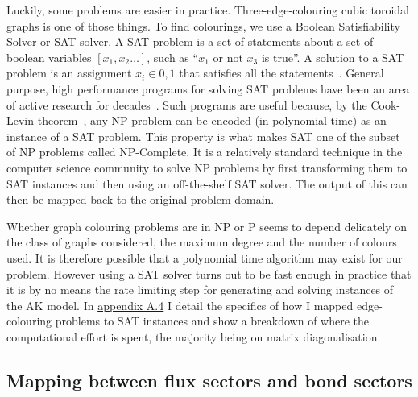 Luckily, some problems are easier in practice. Three-edge-colouring cubic toroidal graphs is one of those things. To find colourings, we use a Boolean Satisfiability Solver or SAT solver. A SAT problem is a set of statements about a set of boolean variables \([x_1, x_2\ldots]\), such as ``\(x_1\) or not \(x_3\) is true''. A solution to a SAT problem is an assignment \(x_i \in {0,1}\) that satisfies all the statements~\autocite{Karp1972}. General purpose, high performance programs for solving SAT problems have been an area of active research for decades~\autocite{alounehComprehensiveStudyAnalysis2019}. Such programs are useful because, by the Cook-Levin theorem~\autocite{cookComplexityTheoremprovingProcedures1971,levin1973universal}, any NP problem can be encoded (in polynomial time) as an instance of a SAT problem. This property is what makes SAT one of the subset of NP problems called NP-Complete. It is a relatively standard technique in the computer science community to solve NP problems by first transforming them to SAT instances and then using an off-the-shelf SAT solver. The output of this can then be mapped back to the original problem domain.

Whether graph colouring problems are in NP or P seems to depend delicately on the class of graphs considered, the maximum degree and the number of colours used. It is therefore possible that a polynomial time algorithm may exist for our problem. However using a SAT solver turns out to be fast enough in practice that it is by no means the rate limiting step for generating and solving instances of the AK model. In \protect\hyperlink{app-lattice-generation}{appendix A.4} I detail the specifics of how I mapped edge-colouring problems to SAT instances and show a breakdown of where the computational effort is spent, the majority being on matrix diagonalisation.

\hypertarget{mapping-between-flux-sectors-and-bond-sectors}{%
\subsection{Mapping between flux sectors and bond sectors}\label{mapping-between-flux-sectors-and-bond-sectors}}

